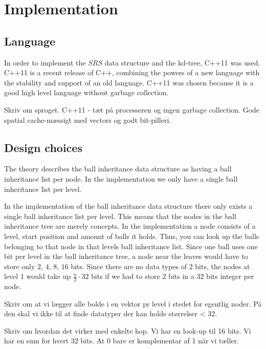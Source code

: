 \chapter{Implementation}

\section{Language}

In order to implement the $SRS$ data structure and the kd-tree, C++11 was used. C++11 is a recent release of C++, combining the powers of a new language with the stability and support of an old language. C++11 was chosen because it is a good high level language without garbage collection.

Skriv om sproget. C++11 - tæt på processeren og ingen garbage collection. Gode spatial cache-mæssigt med vectors og godt bit-pilleri.

\section{Design choices}

The theory describes the ball inheritance data structure as having a ball inheritance list per node. In the implementation we only have a single ball inheritance list per level. 

In the implementation of the ball inheritance data structure there only exists a single ball inheritance list per level. This means that the nodes in the ball inheritance tree are merely concepts. In the implementation a node consists of a level, start position and amount of balls it holds. Thus, you can look up the balls belonging to that node in that levels ball inheritance list. Since one ball uses one bit per level in the ball inheritance tree, a node near the leaves would have to store only $2$, $4$, $8$, $16$ bits. Since there are no data types of $2$ bits, the nodes at level $1$ would take up $\frac{n}{2}\cdot 32$ bits if we had to store $2$ bits in a $32$ bits integer per node.



Skriv om at vi lægger alle bolde i en vektor pr level i stedet for egentlig noder. På den skal vi ikke til at finde datatyper der kan holde størrelser < 32.

Skriv om hvordan det virker med enkelte hop. Vi har en look-up til 16 bits. Vi har en sum for hvert 32 bits. At 0 bare er komplementar af 1 når vi tæller.
